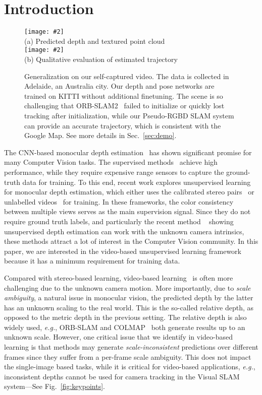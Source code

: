 \documentclass[twocolumn]{svjour3}
\renewcommand{\cite}[1]{\textcolor{blue}{\citep{#1}}}
\def\eg{\emph{e.g.}}
\newcommand{\figref}[1]{Fig.~\ref{#1}}
\newcommand{\secref}[1]{Sec.~\ref{#1}}
\newcommand{\addImg}[2][0.495]{\texttt{[image: \#2]}}
\begin{document}
\section{Introduction}

\begin{figure}[t]
  \centering
  \addImg[0.46]{images/demo-adl.pdf} \\ 
  (a) Predicted depth and textured point cloud \\ 
  \addImg[0.46]{images/pslam_adl.pdf} \\
  (b) Qualitative evaluation of estimated trajectory 
  \caption{Generalization on our self-captured video. The data is collected in Adelaide, an Australia city. Our depth and pose networks are trained on KITTI without additional finetuning. The scene is so challenging that ORB-SLAM2~\cite{murORB2} failed to initialize or quickly lost tracking after initialization, while our Pseudo-RGBD SLAM system can provide an accurate trajectory, which is consistent with the Google Map. See more details in \secref{sec:demo}.
  }\label{fig:demo-adl}
\end{figure}

The CNN-based monocular depth estimation~\cite{eigen2014depth} has shown significant promise for many Computer Vision tasks.
The supervised methods~\cite{fu2018deep, Yin2019enforcing} achieve high performance,
while they require expensive range sensors to capture the ground-truth data for training.
To this end, recent work explores unsupervised learning for monocular depth estimation,
which either uses the calibrated stereo pairs~\cite{garg2016unsupervised,godard2017unsupervised} or unlabelled videos~\cite{zhou2017unsupervised, yin2018geonet} for training.
In these frameworks, the color consistency between multiple views serves as the main supervision signal.
Since they do not require ground truth labels, and particularly the recent method ~\cite{gordon2019depth} showing unsupervised depth estimation can work with the unknown camera intrinsics,
these methods attract a lot of interest in the Computer Vision community.
In this paper, we are interested in the video-based unsupervised learning framework because it has a minimum requirement for training data. 

Compared with stereo-based learning,
video-based learning~\cite{zhou2017unsupervised} is often more challenging due to the unknown camera motion.
More importantly, due to \emph{scale ambiguity}, a natural issue in monocular vision, 
the predicted depth by the latter has an unknown scaling to the real world.
This is the so-called relative depth, as opposed to the metric depth in the previous setting.
The relative depth is also widely used,
\eg, O\-R\-B-S\-L\-A\-M \cite{mur2015orb} and COLMAP~\cite{schonberger2016structure} both generate results up to an unknown scale.
However, one critical issue that we identify in video-based learning is that methods may generate \emph{scale-inconsistent} predictions over different frames
since they suffer from a per-frame scale ambiguity.
This does not impact the single-image based tasks,
while it is critical for video-based applications,
\eg, inconsistent depths cannot be used for camera tracking in the Visual SLAM system---See \figref{fig:keypoints}.
\end{document}
